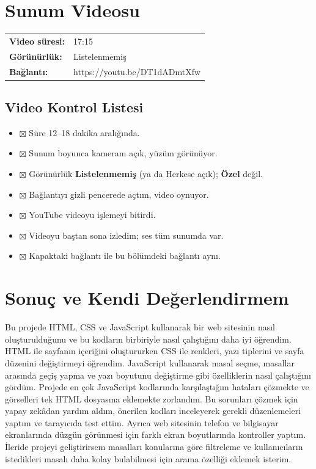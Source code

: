 \documentclass[12pt,a4paper]{article}
\begin{document}
\section{Sunum Videosu}
\begin{center}
\begin{tabular}{@{}ll@{}}
\textbf{Video süresi:} & 17:15 \quad \\
\textbf{Görünürlük:} & Listelenmemiş \\
\textbf{Bağlantı:} & https://youtu.be/DT1dADmtXfw \\
\end{tabular}
\end{center}

\subsection{Video Kontrol Listesi}
\begin{itemize}[label={}]
  \item $\boxtimes$  Süre 12--18 dakika aralığında.
  \item $\boxtimes$ Sunum boyunca kameram açık, yüzüm görünüyor.
  \item $\boxtimes$ Görünürlük \textbf{Listelenmemiş} (ya da Herkese açık); \textbf{Özel} değil.
  \item $\boxtimes$ Bağlantıyı gizli pencerede açtım, video oynuyor.
  \item $\boxtimes$ YouTube videoyu işlemeyi bitirdi.
  \item $\boxtimes$ Videoyu baştan sona izledim; ses tüm sunumda var.
  \item $\boxtimes$ Kapaktaki bağlantı ile bu bölümdeki bağlantı aynı.
\end{itemize}

\section{Sonuç ve Kendi Değerlendirmem}

Bu projede HTML, CSS ve JavaScript kullanarak bir web sitesinin nasıl oluşturulduğunu ve bu kodların birbiriyle nasıl çalıştığını daha iyi öğrendim. HTML ile sayfanın içeriğini oluştururken CSS ile renkleri, yazı tiplerini ve sayfa düzenini değiştirmeyi öğrendim. JavaScript kullanarak masal seçme, masallar arasında geçiş yapma ve yazı boyutunu değiştirme gibi özelliklerin nasıl çalıştığını gördüm. Projede en çok JavaScript kodlarında karşılaştığım hataları çözmekte ve görselleri tek HTML dosyasına eklemekte zorlandım. Bu sorunları çözmek için yapay zekâdan yardım aldım, önerilen kodları inceleyerek gerekli düzenlemeleri yaptım ve tarayıcıda test ettim. Ayrıca web sitesinin telefon ve bilgisayar ekranlarında düzgün görünmesi için farklı ekran boyutlarında kontroller yaptım. İleride projeyi geliştirirsem masalları konularına göre filtreleme ve kullanıcıların istedikleri masalı daha kolay bulabilmesi için arama özelliği eklemek isterim.
\end{document}
